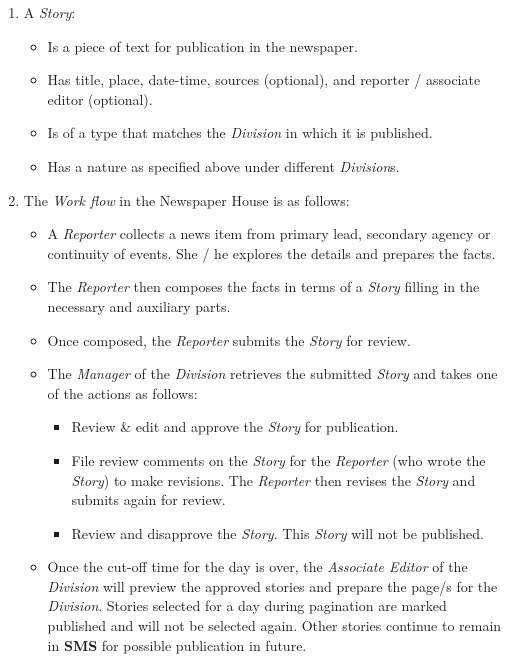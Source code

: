 \documentclass{article}
\begin{document}
\begin{enumerate}
\begin{enumerate}
\item A {\em Story}:
\begin{itemize}
\item Is a piece of text for publication in the newspaper.
\item Has title, place, date-time, sources (optional), and reporter / associate editor (optional).
\item Is of a type that matches the {\em Division} in which it is published.
\item Has a nature as specified above under different {\em Division}s.
\end{itemize}

\item The {\em Work flow} in the \textsf{Newspaper House} is as follows: 

\begin{itemize}
\item A {\em Reporter} collects a news item from primary lead, secondary agency or continuity of events. She / he explores the details and prepares the facts.
\item The {\em Reporter} then composes the facts in terms of a {\em Story} filling in the necessary and auxiliary parts.
\item Once composed, the {\em Reporter} submits the {\em Story} for review.
\item The {\em Manager} of the {\em Division} retrieves the submitted {\em Story} and takes one of the actions as follows:
\begin{itemize}

\item Review \& edit and approve the {\em Story} for publication.
\item File review comments on the {\em Story} for the {\em Reporter} (who wrote the {\em Story}) to make revisions. The {\em Reporter} then revises the {\em Story} and submits again for review.
\item Review and disapprove the {\em Story}. This {\em Story} will not be published.

\end{itemize}

\item Once the cut-off time for the day is over, the {\em Associate Editor} of the {\em Division} will preview the approved stories and prepare the page/s for the {\em Division}. Stories selected for a day during pagination are marked published and will not be selected again. Other stories continue to remain in {\bf SMS} for possible publication in future.


\end{itemize}
\end{enumerate}
\end{enumerate}
\end{document}
